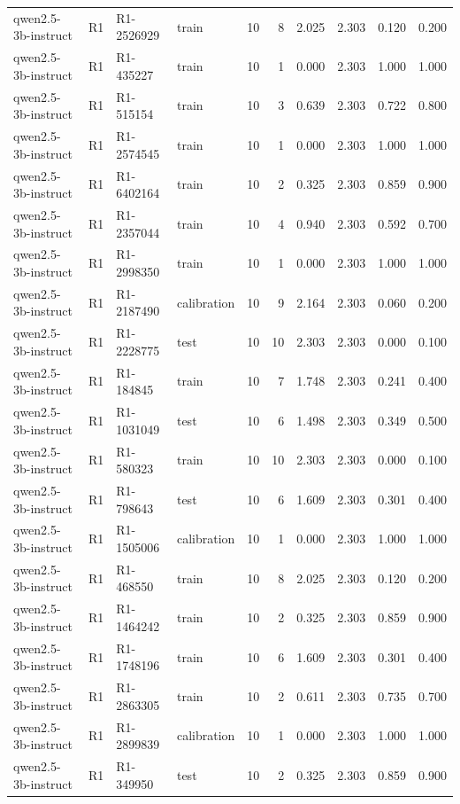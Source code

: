 \begin{table}
\begin{tabular}{llllrrrrrr}
qwen2.5-3b-instruct & R1 & R1-2526929 & train & 10 & 8 & 2.025 & 2.303 & 0.120 & 0.200 \\
qwen2.5-3b-instruct & R1 & R1-435227 & train & 10 & 1 & 0.000 & 2.303 & 1.000 & 1.000 \\
qwen2.5-3b-instruct & R1 & R1-515154 & train & 10 & 3 & 0.639 & 2.303 & 0.722 & 0.800 \\
qwen2.5-3b-instruct & R1 & R1-2574545 & train & 10 & 1 & 0.000 & 2.303 & 1.000 & 1.000 \\
qwen2.5-3b-instruct & R1 & R1-6402164 & train & 10 & 2 & 0.325 & 2.303 & 0.859 & 0.900 \\
qwen2.5-3b-instruct & R1 & R1-2357044 & train & 10 & 4 & 0.940 & 2.303 & 0.592 & 0.700 \\
qwen2.5-3b-instruct & R1 & R1-2998350 & train & 10 & 1 & 0.000 & 2.303 & 1.000 & 1.000 \\
qwen2.5-3b-instruct & R1 & R1-2187490 & calibration & 10 & 9 & 2.164 & 2.303 & 0.060 & 0.200 \\
qwen2.5-3b-instruct & R1 & R1-2228775 & test & 10 & 10 & 2.303 & 2.303 & 0.000 & 0.100 \\
qwen2.5-3b-instruct & R1 & R1-184845 & train & 10 & 7 & 1.748 & 2.303 & 0.241 & 0.400 \\
qwen2.5-3b-instruct & R1 & R1-1031049 & test & 10 & 6 & 1.498 & 2.303 & 0.349 & 0.500 \\
qwen2.5-3b-instruct & R1 & R1-580323 & train & 10 & 10 & 2.303 & 2.303 & 0.000 & 0.100 \\
qwen2.5-3b-instruct & R1 & R1-798643 & test & 10 & 6 & 1.609 & 2.303 & 0.301 & 0.400 \\
qwen2.5-3b-instruct & R1 & R1-1505006 & calibration & 10 & 1 & 0.000 & 2.303 & 1.000 & 1.000 \\
qwen2.5-3b-instruct & R1 & R1-468550 & train & 10 & 8 & 2.025 & 2.303 & 0.120 & 0.200 \\
qwen2.5-3b-instruct & R1 & R1-1464242 & train & 10 & 2 & 0.325 & 2.303 & 0.859 & 0.900 \\
qwen2.5-3b-instruct & R1 & R1-1748196 & train & 10 & 6 & 1.609 & 2.303 & 0.301 & 0.400 \\
qwen2.5-3b-instruct & R1 & R1-2863305 & train & 10 & 2 & 0.611 & 2.303 & 0.735 & 0.700 \\
qwen2.5-3b-instruct & R1 & R1-2899839 & calibration & 10 & 1 & 0.000 & 2.303 & 1.000 & 1.000 \\
qwen2.5-3b-instruct & R1 & R1-349950 & test & 10 & 2 & 0.325 & 2.303 & 0.859 & 0.900 \\

\end{tabular}
\end{table}
